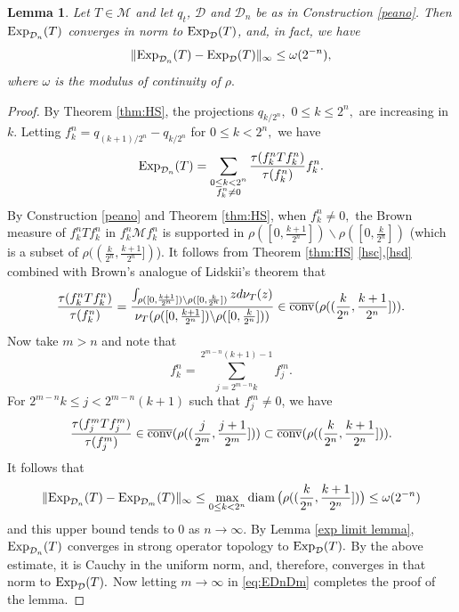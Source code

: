 \documentclass{amsart}
\theoremstyle{plain}
\newtheorem{lem}[thm]{Lemma}
\theoremstyle{remark}
\begin{document}
\begin{lem}\label{lem:Enormconv}
Let $T\in\mathcal{M}$ and let $q_t$, $\mathcal{D}$ and $\mathcal{D}_n$ be as in Construction \ref{peano}.
Then ${\rm Exp}_{\mathcal{D}_n}(T)$ converges in norm to ${\rm Exp}_{\mathcal{D}}(T)$, and, in fact, we have
$$\|{\rm Exp}_{\mathcal{D}_n}(T)-{\rm Exp}_{\mathcal{D}}(T)\|_{\infty}\le\omega(2^{-n}),$$
where $\omega$ is the modulus of continuity of $\rho.$
\end{lem}
\begin{proof} By Theorem \ref{thm:HS}, the projections $q_{k/2^n},$ $0\leq k\leq 2^n,$ are increasing in $k.$ Letting $f^n_k=q_{(k+1)/2^n}-q_{k/2^n}$ for $0\le k<2^n,$ we have
\begin{equation}\label{eq:EDn}
{\rm Exp}_{\mathcal{D}_n}(T)=\sum_{\substack{0\le k<2^n \\ f^n_k\ne0}}\frac{\tau(f^n_kTf^n_k)}{\tau(f^n_k)}f^n_k.
\end{equation}
By Construction \ref{peano} and Theorem \ref{thm:HS}, when $f^n_k\ne0,$ the Brown measure of $f^n_kTf^n_k$ in $f^n_k\mathcal{M}f^n_k$ is supported in $\rho([0,\frac{k+1}{2^n}])\backslash \rho([0,\frac{k}{2^n}])$ (which is a subset of $\rho((\frac{k}{2^n},\frac{k+1}{2^n}])$). It follows from Theorem \ref{thm:HS} \eqref{hsc},\eqref{hsd} combined with Brown's analogue of Lidskii's theorem \cite{Brown} that
\begin{equation}\label{trace partitioning}
\frac{\tau(f^n_kTf^n_k)}{\tau(f^n_k)}=\frac{\int_{\rho([0,\frac{k+1}{2^n}])\backslash \rho([0,\frac{k}{2^n}])}zd\nu_T(z)}{\nu_T(\rho([0,\frac{k+1}{2^n}])\backslash \rho([0,\frac{k}{2^n}]))}\in\overline{\rm conv}(\rho((\frac{k}{2^n},\frac{k+1}{2^n}])).
\end{equation}
Now take $m>n$ and note that
$$f^n_k=\sum_{j=2^{m-n}k}^{2^{m-n}(k+1)-1}f_j^m.$$
For $2^{m-n}k\leq j< 2^{m-n}(k+1)$ such that $f^m_j\ne0$, we have
$$\frac{\tau(f^m_jTf^m_j)}{\tau(f^m_j)}\in\overline{\rm conv}(\rho((\frac{j}{2^m},\frac{j+1}{2^m}]))\subset\overline{\rm conv}(\rho((\frac{k}{2^n},\frac{k+1}{2^n}])).$$
It follows that
\begin{equation}\label{eq:EDnDm}
\|{\rm Exp}_{\mathcal{D}_n}(T)-{\rm Exp}_{\mathcal{D}_m}(T)\|_{\infty}\le\max_{0\le k<2^n}\operatorname{diam}\big(\rho((\frac{k}{2^n},\frac {k+1}{2^n}])\big)\le\omega(2^{-n})
\end{equation}
and this upper bound tends to $0$ as $n\to\infty.$
By Lemma \ref{exp limit lemma}, ${\rm Exp}_{\mathcal{D}_n}(T)$ converges in strong operator topology to ${\rm Exp}_{\mathcal{D}}(T).$ By the above estimate, it is Cauchy in the uniform norm, and, therefore, converges in that norm to ${\rm Exp}_{\mathcal{D}}(T).$ Now letting $m\to\infty$ in \eqref{eq:EDnDm} completes the proof of the lemma.
\end{proof}
\end{document}
